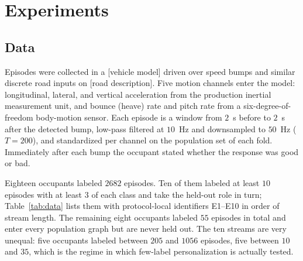 \documentclass[conference]{IEEEtran}
\newif\ifdraftnotes
\newcommand{\draftnote}[1]{\ifdraftnotes\textcolor{red}{\textbf{[TODO: #1]}}\fi}
\begin{document}
\section{Experiments}
\label{sec:experiments}

\subsection{Data}
\label{sec:data}

Episodes were collected in a [vehicle model] driven over speed bumps and similar discrete road inputs on [road description]. \draftnote{Vehicle, road, sensor models, sampling, mounting, recruitment, consent and ethics statement; same items as the companion data description.} Five motion channels enter the model: longitudinal, lateral, and vertical acceleration from the production inertial measurement unit, and bounce (heave) rate and pitch rate from a six-degree-of-freedom body-motion sensor. Each episode is a window from $2$~s before to $2$~s after the detected bump, low-pass filtered at $10$~Hz and downsampled to $50$~Hz ($T=200$), and standardized per channel on the population set of each fold. Immediately after each bump the occupant stated whether the response was good or bad.

Eighteen occupants labeled $2682$ episodes. Ten of them labeled at least $10$ episodes with at least $3$ of each class and take the held-out role in turn; Table~\ref{tab:data} lists them with protocol-local identifiers E1--E10 in order of stream length. The remaining eight occupants labeled $55$ episodes in total and enter every population graph but are never held out. The ten streams are very unequal: five occupants labeled between $205$ and $1056$ episodes, five between $10$ and $35$, which is the regime in which few-label personalization is actually tested.
\end{document}
